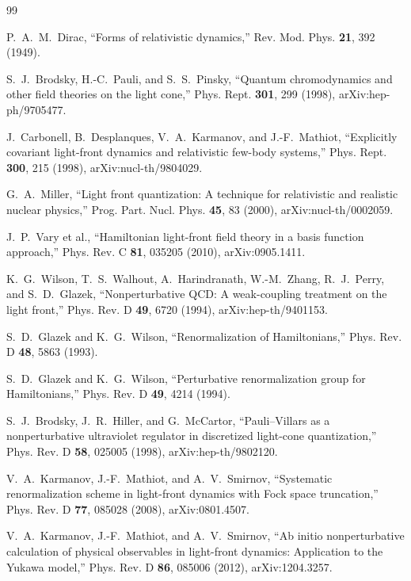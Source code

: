 \documentclass[11pt]{article}
\begin{document}
\small
\begin{thebibliography}{99}

P.~A.~M.~Dirac,
``Forms of relativistic dynamics,''
Rev. Mod. Phys. \textbf{21}, 392 (1949).

S.~J.~Brodsky, H.-C.~Pauli, and S.~S.~Pinsky,
``Quantum chromodynamics and other field theories on the light cone,''
Phys. Rept. \textbf{301}, 299 (1998),
arXiv:hep-ph/9705477.

J.~Carbonell, B.~Desplanques, V.~A.~Karmanov, and J.-F.~Mathiot,
``Explicitly covariant light-front dynamics and relativistic few-body
systems,''
Phys. Rept. \textbf{300}, 215 (1998),
arXiv:nucl-th/9804029.

G.~A.~Miller,
``Light front quantization: A technique for relativistic and realistic
nuclear physics,''
Prog. Part. Nucl. Phys. \textbf{45}, 83 (2000),
arXiv:nucl-th/0002059.

J.~P.~Vary et al.,
``Hamiltonian light-front field theory in a basis function approach,''
Phys. Rev. C \textbf{81}, 035205 (2010),
arXiv:0905.1411.

K.~G.~Wilson, T.~S.~Walhout, A.~Harindranath, W.-M.~Zhang,
R.~J.~Perry, and S.~D.~Glazek,
``Nonperturbative QCD: A weak-coupling treatment on the light front,''
Phys. Rev. D \textbf{49}, 6720 (1994),
arXiv:hep-th/9401153.

S.~D.~Glazek and K.~G.~Wilson,
``Renormalization of Hamiltonians,''
Phys. Rev. D \textbf{48}, 5863 (1993).

S.~D.~Glazek and K.~G.~Wilson,
``Perturbative renormalization group for Hamiltonians,''
Phys. Rev. D \textbf{49}, 4214 (1994).

S.~J.~Brodsky, J.~R.~Hiller, and G.~McCartor,
``Pauli--Villars as a nonperturbative ultraviolet regulator in discretized
light-cone quantization,''
Phys. Rev. D \textbf{58}, 025005 (1998),
arXiv:hep-th/9802120.

V.~A.~Karmanov, J.-F.~Mathiot, and A.~V.~Smirnov,
``Systematic renormalization scheme in light-front dynamics with Fock space
truncation,''
Phys. Rev. D \textbf{77}, 085028 (2008),
arXiv:0801.4507.

V.~A.~Karmanov, J.-F.~Mathiot, and A.~V.~Smirnov,
``Ab initio nonperturbative calculation of physical observables in
light-front dynamics: Application to the Yukawa model,''
Phys. Rev. D \textbf{86}, 085006 (2012),
arXiv:1204.3257.


\end{thebibliography}
\end{document}
